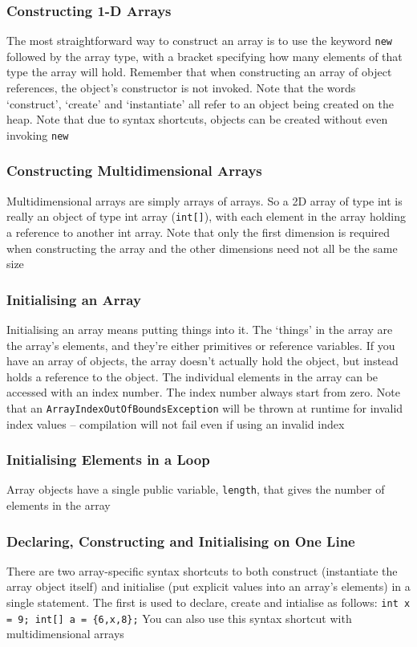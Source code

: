 \subsubsection{Constructing 1-D Arrays}
The most straightforward way to  construct an array is to use the keyword 
\verb#new# followed by the array type, with a bracket specifying how many 
elements of that type the array will hold. Remember that when constructing an 
array of object references, the object's constructor is not invoked. Note that 
the words `construct', `create' and `instantiate' all refer to an object being 
created on the heap. Note that due to syntax shortcuts, objects can be created 
without even invoking \verb#new#

\subsubsection{Constructing Multidimensional Arrays}
Multidimensional arrays are simply arrays of arrays. So a 2D array of type int 
is really an object of type int array (\verb#int[]#), with each element in the 
array holding a reference to another int array. Note that only the first 
dimension is required when constructing the array and the other dimensions need 
not all be the same size

\subsubsection{Initialising an Array}
Initialising an array means putting things into it. The `things' in the array 
are the array's elements, and they're either primitives or reference variables.
If you have an array of objects, the array doesn't actually hold the object, 
but instead holds a reference to the object. The individual elements in the 
array can be accessed with an index number. The index number always start from 
zero. Note that an \verb#ArrayIndexOutOfBoundsException# will be thrown at 
runtime for invalid index values -- compilation will not fail even if using an 
invalid index

\subsubsection{Initialising Elements in a Loop}
Array objects have a single public variable, \verb#length#, that gives the 
number of elements in the array

\subsubsection{Declaring, Constructing and Initialising on One Line}
There are two array-specific syntax shortcuts to both construct (instantiate 
the array object itself) and initialise (put explicit values into an array's 
elements) in a single statement. The first is used to declare, create and 
intialise as follows: \verb#int x = 9; int[] a = {6,x,8};# You can also use 
this syntax shortcut with multidimensional arrays


